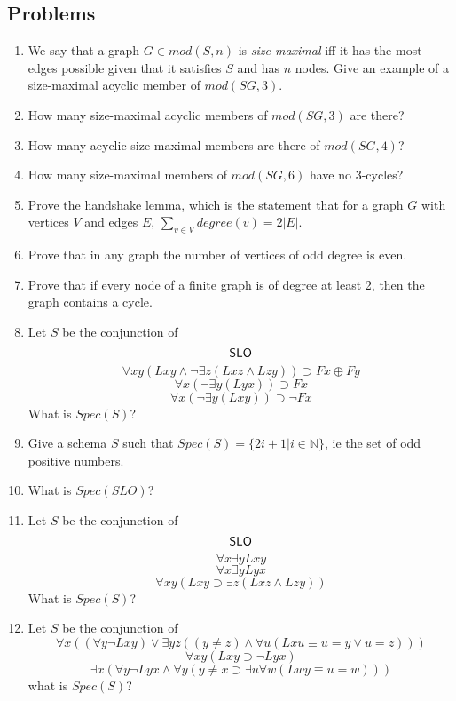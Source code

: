 \newpage
\begin{mdframed}[linewidth=1]
\section*{Problems}
\begin{enumerate}
    \item We say that a graph $G \in mod(S, n)$ is \emph{size maximal} iff it has the most edges possible given that it satisfies $S$ and has $n$ nodes. Give an example of a size-maximal acyclic member of $mod(SG, 3)$. 

    \item How many size-maximal acyclic members of $mod(SG, 3)$ are there?

    \item How many acyclic size maximal members are there of $mod(SG, 4)$?

    \item How many size-maximal members of $mod(SG, 6)$ have no 3-cycles? 

    \item Prove the handshake lemma, which is the statement that for a graph $G$ with vertices $V$ and edges $E$, $\sum_{v \in V}degree(v) = 2|E|$. 

    \item Prove that in any graph the number of vertices of odd degree is even.

    \item Prove that if every node of a finite graph is of degree at least 2, then the graph contains a cycle. 

    \item Let $S$ be the conjunction of 
   \[
       \mbox{$\mathsf{SLO}$}
   \]
   \[
       \forall xy(Lxy \land \lnot \exists z(Lxz \land Lzy)) \supset Fx \oplus Fy
   \]
   \[
       \forall x(\lnot \exists y(Lyx))\supset Fx
   \]
   \[
       \forall x(\lnot \exists y(Lxy))\supset \lnot Fx
   \]
   What is $Spec(S)$?

   \item Give a schema $S$ such that $Spec(S) = \{2i + 1 | i \in \mathbb{N}\}$, ie the set of odd positive numbers. 

   \item What is $Spec(SLO)$?

   \item Let $S$ be the conjunction of 
   \[
       \mbox{$\mathsf{SLO}$}
   \]
   \[
       \forall x \exists y Lxy
   \]
   \[
       \forall x \exists y Lyx
   \]
   \[
       \forall xy(Lxy \supset \exists z(Lxz \land Lzy))
   \]
   What is $Spec(S)$?

   \item Let $S$ be the conjunction of
   \[
       \forall x((\forall y \lnot Lxy) \vee \exists yz((y \neq z) \land \forall u(Lxu \equiv u = y \vee u = z)))
   \]
   \[
       \forall xy(Lxy \supset \lnot Lyx)
   \]
   \[
       \exists x(\forall y \lnot Lyx \land \forall y(y \neq x \supset \exists u \forall w(Lwy \equiv u = w)))
   \]
   what is $Spec(S)$?
\end{enumerate}
\end{mdframed}

